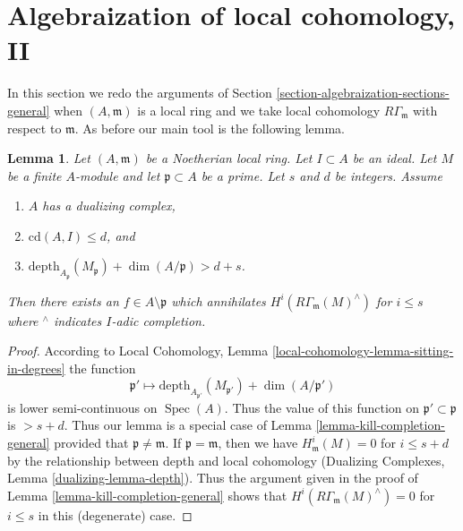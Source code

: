 \documentclass{stacks-project}
\theoremstyle{plain}
\newtheorem{lemma}[subsection]{Lemma}
\theoremstyle{definition}
\theoremstyle{remark}
\numberwithin{equation}{subsection}
\def\Spec{\mathop{\mathrm{Spec}}}
\begin{document}
\section{Algebraization of local cohomology, II}
\label{section-algebraization-punctured}

\noindent
In this section we redo the arguments of
Section \ref{section-algebraization-sections-general}
when $(A, \mathfrak m)$ is a local ring and we take local cohomology
$R\Gamma_\mathfrak m$ with respect to $\mathfrak m$. As before our
main tool is the following lemma.

\begin{lemma}
\label{lemma-kill-completion}
Let $(A, \mathfrak m)$ be a Noetherian local ring.
Let $I \subset A$ be an ideal. Let $M$ be a finite $A$-module and
let $\mathfrak p \subset A$ be a prime. Let $s$ and $d$ be integers. Assume
\begin{enumerate}
\item $A$ has a dualizing complex,
\item $\text{cd}(A, I) \leq d$, and
\item
$\text{depth}_{A_\mathfrak p}(M_\mathfrak p) + \dim(A/\mathfrak p) > d + s$.
\end{enumerate}
Then there exists an $f \in A \setminus \mathfrak p$ which annihilates
$H^i(R\Gamma_\mathfrak m(M)^\wedge)$ for $i \leq s$ where ${}^\wedge$
indicates $I$-adic completion.
\end{lemma}

\begin{proof}
According to Local Cohomology, Lemma
\ref{local-cohomology-lemma-sitting-in-degrees}
the function
$$
\mathfrak p' \longmapsto
\text{depth}_{A_{\mathfrak p'}}(M_{\mathfrak p'}) + \dim(A/\mathfrak p')
$$
is lower semi-continuous on $\Spec(A)$. Thus the value
of this function on $\mathfrak p' \subset \mathfrak p$
is $> s + d$. Thus our lemma is a special case of
Lemma \ref{lemma-kill-completion-general}
provided that $\mathfrak p \not = \mathfrak m$.
If $\mathfrak p = \mathfrak m$,
then we have $H^i_\mathfrak m(M) = 0$ for $i \leq s + d$ by
the relationship between depth and local cohomology
(Dualizing Complexes, Lemma \ref{dualizing-lemma-depth}).
Thus the argument given in the proof of
Lemma \ref{lemma-kill-completion-general}
shows that $H^i(R\Gamma_\mathfrak m(M)^\wedge) = 0$
for $i \leq s$ in this (degenerate) case.
\end{proof}
\end{document}
